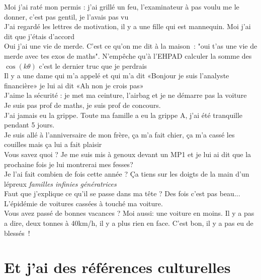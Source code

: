 \documentclass[french, a4paper, openany]{book}
\begin{document}
	\noindent \og Moi j'ai raté mon permis : j'ai grillé un feu, l'examinateur à pas voulu me le donner, c'est pas gentil, je l'avais pas vu \fg \\
	\og J'ai regardé les lettres de motivation, il y a une fille qui est mannequin. Moi j'ai dit que j'étais d'accord \fg \\
	\og Oui j'ai une vie de merde. C'est ce qu'on me dit à la maison~: "oui t'as une vie de merde avec tes exos de maths". N'empêche qu'à l'EHPAD calculer la somme des $\cos(k \theta)$ c'est le dernier truc que je perdrais \fg \\
	\og Il y a une dame qui m'a appelé et qui m'a dit «Bonjour je suis l'analyste financière» je lui ai dit «Ah non je crois pas» \fg \\
	\og J'aime la sécurité : je met ma ceinture, l'airbag et je ne démarre pas la voiture \fg \\
	\og Je suis pas prof de maths, je suis prof de concours. \fg \\
	\og J'ai jamais eu la grippe. Toute ma famille a eu la grippe A, j'ai été tranquille pendant 5 jours. \fg \\
	\og Je suis allé à l'anniversaire de mon frère, ça m'a fait chier, ça m'a cassé les couilles mais ça lui a fait plaisir \fg \\
	\og Vous savez quoi ? Je me suis mis à genoux devant un MP1 et je lui ai dit que la prochaine fois je lui montrerai mes fesses? \fg \\
	\og Je l'ai fait combien de fois cette année ? Ça tiens sur les doigts de la main d'un lépreux \fg \emph{familles infinies génératrices} \\
	\og Faut que j'explique ce qu'il se passe dans ma tête ? Des fois c'est pas beau... \fg \\
	\og L'épidémie de voitures cassées à touché ma voiture. \fg \\
	\og Vous avez passé de bonnes vacances ? Moi aussi: une voiture en moins. Il y a pas a dire, deux tonnes à 40km/h, il y a plus rien en face. C'est bon, il y a pas eu de blessés~! \fg \\

\section{Et j'ai des références culturelles}
\end{document}
